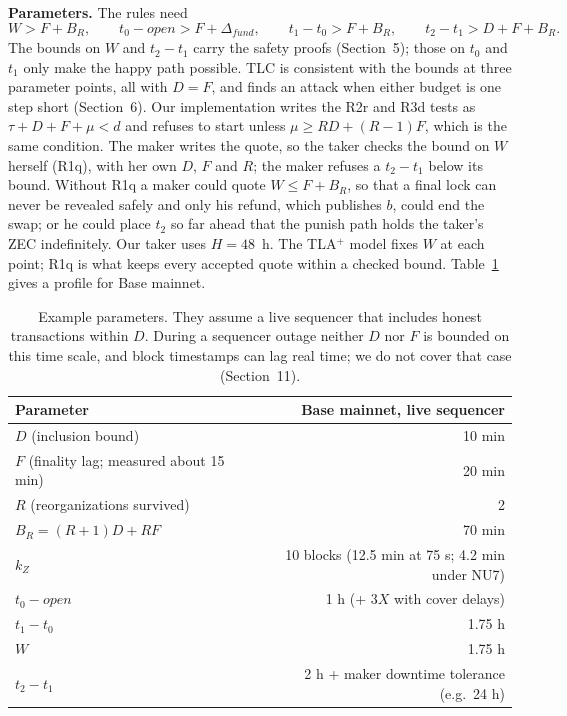 \documentclass[10pt,letterpaper]{article}
\theoremstyle{plain}
\theoremstyle{definition}
\begin{document}
\textbf{Parameters.} The rules need
\[
W > F + B_R,\qquad t_0 - \mathit{open} > F + \Delta_{\mathit{fund}},\qquad t_1 - t_0 > F + B_R,\qquad t_2 - t_1 > D + F + B_R .
\]
The bounds on $W$ and $t_2 - t_1$ carry the safety proofs (Section~5); those on $t_0$ and $t_1$
only make the happy path possible. TLC is consistent with the bounds at three parameter points, all with $D=F$, and finds an
attack when either budget is one step short (Section~6). Our implementation writes the R2r and
R3d tests as $\tau + D + F + \mu < d$ and refuses to start unless $\mu \ge RD + (R-1)F$, which is
the same condition. The maker writes the quote, so the taker checks the bound on $W$ herself
(R1q), with her own $D$, $F$ and $R$; the maker refuses a $t_2 - t_1$ below its bound. Without
R1q a maker could quote $W \le F + B_R$, so that a final lock can never be revealed safely and
only his refund, which publishes $b$, could end the swap; or he could place $t_2$ so far ahead
that the punish path holds the taker's ZEC indefinitely. Our taker uses $H = 48$~h. The TLA$^+$
model fixes $W$ at each point; R1q is what keeps every accepted quote within a checked bound. Table~\ref{tab:params} gives a profile for Base mainnet.

\begin{table}[H]
\centering\small
\begin{tabular}{@{}lr@{}}
\toprule
\textbf{Parameter} & \textbf{Base mainnet, live sequencer}\\
\midrule
$D$ (inclusion bound) & 10 min\\
$F$ (finality lag; measured about 15 min) & 20 min\\
$R$ (reorganizations survived) & 2\\
$B_R = (R+1)D + RF$ & 70 min\\
$k_Z$ & 10 blocks (12.5 min at 75 s; 4.2 min under NU7)\\
$t_0 - \mathit{open}$ & 1 h (+ $3X$ with cover delays)\\
$t_1 - t_0$ & 1.75 h\\
$W$ & 1.75 h\\
$t_2 - t_1$ & 2 h + maker downtime tolerance (e.g.\ 24 h)\\
\bottomrule
\end{tabular}
\caption{Example parameters. They assume a live sequencer that includes honest transactions
within $D$. During a sequencer outage neither $D$ nor $F$ is bounded on this time scale, and
block timestamps can lag real time; we do not cover that case (Section~11).}
\label{tab:params}
\end{table}
\end{document}
